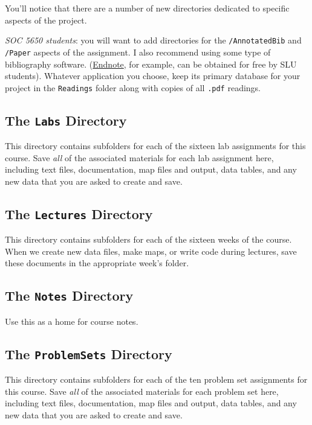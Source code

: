 \documentclass[]{book}
\theoremstyle{definition}
\theoremstyle{definition}
\theoremstyle{remark}
\begin{document}
You'll notice that there are a number of new directories dedicated to
specific aspects of the project.

\emph{SOC 5650 students}: you will want to add directories for the
\texttt{/AnnotatedBib} and \texttt{/Paper} aspects of the assignment. I
also recommend using some type of bibliography software.
(\href{http://endnote.com}{Endnote}, for example, can be obtained for
free by SLU students). Whatever application you choose, keep its primary
database for your project in the \texttt{Readings} folder along with
copies of all \texttt{.pdf} readings.

\subsection{\texorpdfstring{The \texttt{Labs}
Directory}{The Labs Directory}}\label{the-labs-directory}

This directory contains subfolders for each of the sixteen lab
assignments for this course. Save \emph{all} of the associated materials
for each lab assignment here, including text files, documentation, map
files and output, data tables, and any new data that you are asked to
create and save.

\subsection{\texorpdfstring{The \texttt{Lectures}
Directory}{The Lectures Directory}}\label{the-lectures-directory}

This directory contains subfolders for each of the sixteen weeks of the
course. When we create new data files, make maps, or write code during
lectures, save these documents in the appropriate week's folder.

\subsection{\texorpdfstring{The \texttt{Notes}
Directory}{The Notes Directory}}\label{the-notes-directory}

Use this as a home for course notes.

\subsection{\texorpdfstring{The \texttt{ProblemSets}
Directory}{The ProblemSets Directory}}\label{the-problemsets-directory}

This directory contains subfolders for each of the ten problem set
assignments for this course. Save \emph{all} of the associated materials
for each problem set here, including text files, documentation, map
files and output, data tables, and any new data that you are asked to
create and save.
\end{document}
